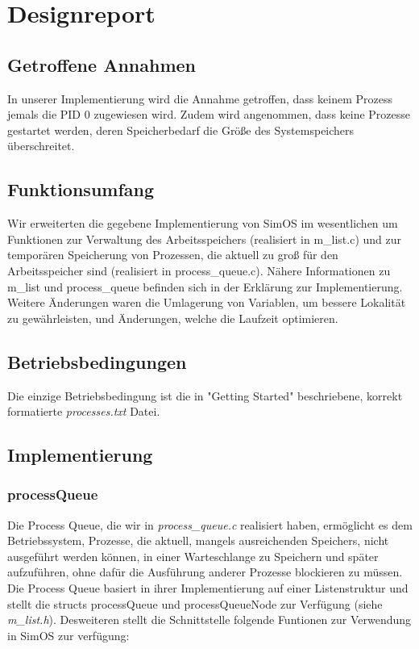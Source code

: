 \section{Designreport}
\subsection{Getroffene Annahmen}
In unserer Implementierung wird die Annahme getroffen, dass keinem Prozess jemals die PID 0 zugewiesen wird. Zudem wird angenommen, dass keine Prozesse gestartet werden, deren Speicherbedarf die Größe des Systemspeichers überschreitet.

\subsection{Funktionsumfang}
Wir erweiterten die gegebene Implementierung von SimOS im wesentlichen um Funktionen zur Verwaltung des Arbeitsspeichers (realisiert in m\_list.c) und zur temporären Speicherung von Prozessen, die aktuell zu groß für den Arbeitsspeicher sind (realisiert in process\_queue.c).
Nähere Informationen zu m\_list und process\_queue befinden sich in der Erklärung zur Implementierung.
Weitere Änderungen waren die Umlagerung von Variablen, um bessere Lokalität zu gewährleisten, und Änderungen, welche die Laufzeit optimieren.

\subsection{Betriebsbedingungen}
Die einzige Betriebsbedingung ist die in "Getting Started" beschriebene, korrekt formatierte \textit{processes.txt} Datei.


\subsection{Implementierung}

\subsubsection{processQueue}
Die Process Queue, die wir in \textit{process\_queue.c} realisiert haben, ermöglicht es dem Betriebssystem, Prozesse, die aktuell, mangels ausreichenden Speichers, nicht ausgeführt werden können, in einer Warteschlange zu Speichern und später aufzuführen, ohne dafür die Ausführung anderer Prozesse blockieren zu müssen.
Die Process Queue basiert in ihrer Implementierung auf einer Listenstruktur und stellt die structs processQueue und processQueueNode zur Verfügung (siehe \textit{m\_list.h}).
Desweiteren stellt die Schnittstelle folgende Funtionen zur Verwendung in SimOS zur verfügung:

